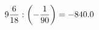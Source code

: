 \documentclass[preview]{standalone}
\begin{document}
\begin{align*}
9 { 6 \over 18 }  :  \left( - { 1 \over 90 } \right) = -840.0
\end{align*}
\end{document}
